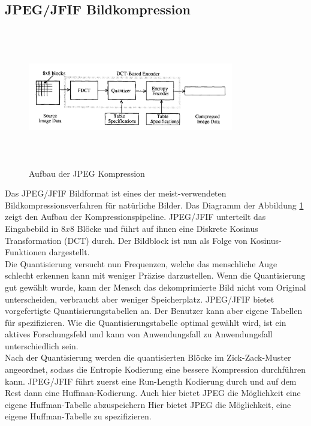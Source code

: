\subsection{JPEG/JFIF Bildkompression}
\begin{figure}[!htbp]
	\center
	\includegraphics[width=0.8\textwidth,height=6cm,keepaspectratio]{./pictures/state/jpeg.png}
	\caption{Aufbau der JPEG Kompression \cite{wallace1992jpeg}}
	\label{state:jpeg:abb}
\end{figure}
Das JPEG/JFIF Bildformat ist eines der meist-verwendeten Bildkompressionsverfahren für natürliche Bilder. Das Diagramm der Abbildung \ref{state:jpeg:abb} zeigt den Aufbau der Kompressionspipeline. JPEG/JFIF unterteilt das Eingabebild in $8x8$ Blöcke und führt auf ihnen eine Diskrete Kosinus Transformation (DCT) durch. Der Bildblock ist nun als Folge von Kosinus-Funktionen dargestellt.\\
Die Quantisierung versucht nun Frequenzen, welche das menschliche Auge schlecht erkennen kann mit weniger Präzise darzustellen. Wenn die Quantisierung gut gewählt wurde, kann der Mensch das dekomprimierte Bild nicht vom Original unterscheiden, verbraucht aber weniger Speicherplatz. JPEG/JFIF bietet vorgefertigte Quantisierungstabellen an. Der Benutzer kann aber eigene Tabellen für spezifizieren. Wie die Quantisierungstabelle optimal gewählt wird, ist ein aktives Forschungsfeld \cite{wu1993rate:jpeg} \cite{wang2001designing:jpeg} und kann von Anwendungsfall zu Anwendungsfall unterschiedlich sein.\\
Nach der Quantisierung werden die quantisierten Blöcke im Zick-Zack-Muster angeordnet, sodass die Entropie Kodierung eine bessere Kompression durchführen kann. JPEG/JFIF führt zuerst eine Run-Length Kodierung durch und auf dem Rest dann eine Huffman-Kodierung. Auch hier bietet JPEG die Möglichkeit eine eigene Huffman-Tabelle abzuspeichern Hier bietet JPEG die Möglichkeit, eine eigene Huffman-Tabelle zu spezifizieren.

